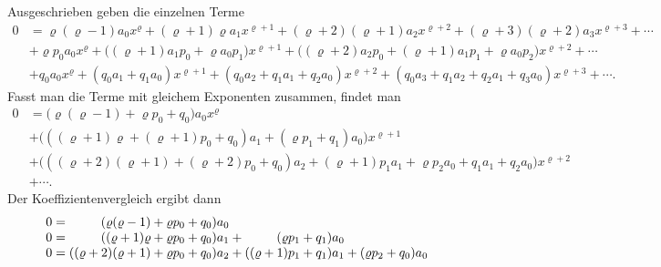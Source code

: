 Ausgeschrieben geben die einzelnen Terme
\begin{align*}
0
&=
\varrho(\varrho-1)a_0x^\varrho
+
(\varrho+1)\varrho a_1x^{\varrho+1}
+
(\varrho+2)(\varrho+1)a_2x^{\varrho+2}
+
(\varrho+3)(\varrho+2)a_3x^{\varrho+3}
+
\cdots
\\
&+
\varrho p_0 a_0 x^{\varrho}
+
\bigl((\varrho +1)a_1p_0 + \varrho a_0 p_1\bigr) x^{\varrho+1}
+
\bigl((\varrho +2)a_2p_0 + (\varrho+1)a_1p_1 + \varrho a_0 p_2\bigr) x^{\varrho+2}
+
\cdots
\label{buch:differentialgleichungen:eqn:dglverallg}
\\
&+
q_0a_0x^{\varrho}
+
(q_0a_1+q_1a_0) x^{\varrho+1}
+
(q_0a_2+q_1a_1+q_2a_0) x^{\varrho+2}
+
(q_0a_3+q_1a_2+q_2a_1+q_3a_0) x^{\varrho+3}
+
\cdots.
\end{align*}
Fasst man die Terme mit gleichem Exponenten zusammen, findet man
\begin{align*}
0
&=
\bigl(
\varrho(\varrho-1) + \varrho p_0 + q_0
\bigr)a_0 x^{\varrho}
\\
&+
\bigl(
((\varrho+1)\varrho 
+
(\varrho+1) p_0
+
q_0) a_1
+
( \varrho p_1 + q_1)a_0
\bigr)x^{\varrho+1}
\\
&+
\bigl(
(
(\varrho+2)(\varrho+1)
+
(\varrho+2)p_0
+
q_0)a_2
+
(\varrho+1)p_1 a_1
+
\varrho p_2 a_0
+q_1a_1+q_2a_0
\bigr)x^{\varrho+2}
\\
&+\cdots.
\end{align*}
Der Koeffizientenvergleich ergibt dann
\[
\renewcommand{\arraycolsep}{0pt}
\begin{array}{rcrlcrlcrl}
0&\mathstrut=\mathstrut&(\varrho(\varrho-1)     + \varrho p_0 + q_0)&a_0
	& &                 &
		&&
\\
0&\mathstrut=\mathstrut&((\varrho+1)\varrho     + \varrho p_0 + q_0)&a_1
	&\mathstrut+\mathstrut&(\varrho p_1+q_1)&a_0
		& &
\\
0&\mathstrut=\mathstrut&((\varrho+2)(\varrho+1) + \varrho p_0 + q_0)&a_2
	&\mathstrut+\mathstrut&((\varrho+1)p_1+q_1)&a_1
		&\mathstrut+\mathstrut&(\varrho p_2+q_0)&a_0
\end{array}
\]

